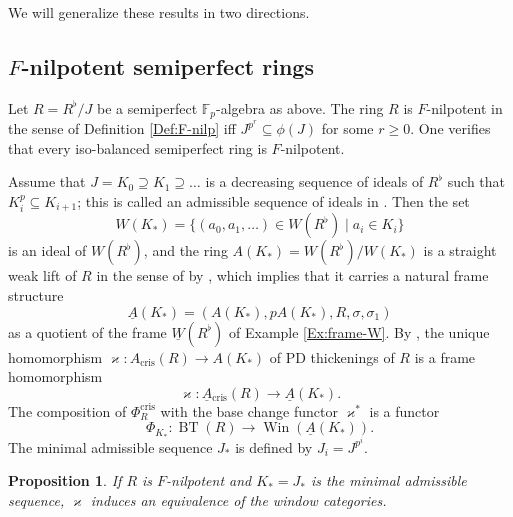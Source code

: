 \documentclass[a4paper,11pt]{article}
\theoremstyle{plain}
\newtheorem{Prop}[Lemma]{Proposition}
\theoremstyle{definition}
\theoremstyle{remark}
\theoremstyle{definition}
\numberwithin{Lemma}{section}
\numberwithin{Subpoint}{Lemma}
\numberwithin{equation}{section}
\newcommand{\FF}{{\mathbb{F}}}
\DeclareMathOperator{\BT}{BT}
\DeclareMathOperator{\Win}{Win}
\DeclareMathOperator{\cris}{cris}
\renewcommand{\u}{\underline}
\newcommand{\chang}[1]{{#1}}
\begin{document}
We will generalize these results in two directions.

\subsection{$F$-nilpotent semiperfect rings}

Let $R=R^\flat/J$ be a semiperfect $\FF_p$-algebra as above.
The ring $R$ is $F$-nilpotent in the sense of Definition \ref{Def:F-nilp}
iff $J^{p^r}\subseteq\phi(J)$ for some $r\ge 0$. 
One verifies that every iso-balanced semiperfect ring is $F$-nilpotent.

Assume that $J=K_0\supseteq K_1\supseteq\ldots$ 
is a decreasing sequence of ideals of $R^\flat$ 
such that $K_i^p\subseteq K_{i+1}$; 
this is called an admissible sequence of ideals 
in \cite[Def.~7.5]{Lau:Semiperfect}. 
Then the set 
\[
W(K_*)=\{(a_0,a_1,\ldots)\in W(R^\flat)\mid a_i\in K_i\}
\]
is an ideal of $W(R^\flat)$,
and the ring $A(K_*)=W(R^\flat)/W(K_*)$ 
is a straight weak lift of $R$ in the sense of 
\cite[Def.~7.3]{Lau:Semiperfect} by \cite[Lemma 7.6]{Lau:Semiperfect},
which implies that it carries a natural frame structure
\[
\u A(K_*)=(A(K_*),pA(K_*),R,\sigma,\sigma_1)
\] 
as a quotient of the frame $\u W(R^\flat)$ of Example \ref{Ex:frame-W}.
By \cite[Lemma 7.4]{Lau:Semiperfect}, 
\chang{the unique homomorphism $\varkappa:A_{\cris}(R)\to A(K_*)$ of PD thickenings of $R$ is a } frame homomorphism
\[
\varkappa:\u A{}_{\cris}(R)\to\u A(K_*).
\]
The composition of $\Phi_R^{\cris}$ with the base change functor 
$\varkappa^*$ is a functor 
\[
\Phi_{K_*}:\BT(R)\to\Win(\u A(K_*)).
\]
The minimal admissible sequence $J_*$ is defined by $J_i=J^{p^i}$.

\begin{Prop}
\label{Pr:kappa-equiv}
If $R$ is $F$-nilpotent and $K_*=J_*$ is the minimal admissible sequence, 
$\varkappa$
induces an equivalence of the window categories.
\end{Prop}
\end{document}
